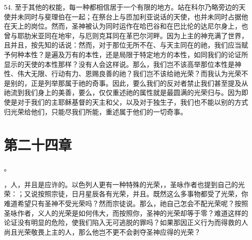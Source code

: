 54. 至于其他的权能，每一种都相信居于一个有限的地方。站在科尔乃略旁边的天使并未同时与斐理伯在一起；在祭台上与匝加利亚说话的天使，也并未同时占据他在天上的岗位。然而，圣神被认为同时运作在哈巴谷和在巴比伦的达尼尔身上，也曾与耶肋米亚同在地牢，与厄则克耳同在革巴尔河畔。因为上主的神充满了世界，且并且，按先知的话说：然而，对于那位无所不在、与天主同在的祂，我们应当赋予何种本性？是遍及万有的本性，还是局限于特定地方的本性，如同我们的论证所显示的天使的本性那样？没有人会这样说。那么，我们岂不该高举那位本性是神性、伟大无限、行动有力、恩赐良善的祂？我们岂不该给祂光荣？而我认为光荣不是别的，正是列举那属于祂的奇事。因此，要么我们的反对者禁止我们甚至提及从祂流到我们身上的美善，要么，仅仅重述祂的属性就是最圆满的光荣归与。因为即使是对于我们的主耶稣基督的天主和父，以及对于独生子，我们也不能以别的方式归光荣给他们，只能尽我们所能，重述属于他们的一切奇事。\par


\section{第二十四章}

。\par

，人，并且是应许的。以色列人更有一种特殊的光荣，，圣咏作者也提到自己的光荣：；又说按照宗徒，日月星辰各有光荣，并且。既然这么多事物都受了光荣，你难道希望只有圣神不受光荣吗？然而宗徒说。那么，祂自己怎会不配光荣呢？按照圣咏作者，义人的光荣是如何伟大，而按照你，圣神的光荣却等于零？难道这样的论证没有明显的危险，使我们陷入无可逃脱的罪吗？如果那因正义行为而得救的人尚且光荣敬畏上主的人，那么他岂不更不会剥夺圣神应得的光荣？\par

